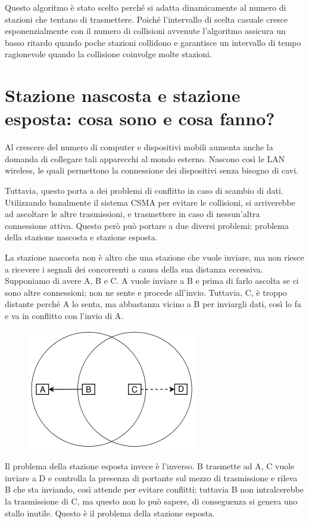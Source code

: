 Questo algoritmo è stato scelto perché si adatta dinamicamente al numero di stazioni che tentano di trasmettere. Poiché l’intervallo di scelta casuale cresce esponenzialmente con il numero di collisioni avvenute l’algoritmo assicura un basso ritardo quando poche stazioni collidono e garantisce un intervallo di tempo ragionevole quando la collisione coinvolge molte stazioni.

\section{Stazione nascosta e stazione esposta: cosa sono e cosa fanno?}

Al crescere del numero di computer e dispositivi mobili aumenta anche la domanda di collegare tali apparecchi al mondo esterno.
Nascono così le LAN wireless, le quali permettono la connessione dei dispositivi senza bisogno di cavi.

Tuttavia, questo porta a dei problemi di conflitto in caso di scambio di dati.
Utilizzando banalmente il sistema CSMA per evitare le collisioni, si arriverebbe ad ascoltare le altre trasmissioni, e trasmettere in caso di nessun’altra connessione attiva.
Questo però può portare a due diversi problemi: problema della stazione nascosta e stazione esposta.

La stazione nascosta non è altro che una stazione che vuole inviare, ma non riesce a ricevere i segnali dei concorrenti a causa della sua distanza eccessiva. Supponiamo di avere A, B e C. A vuole inviare a B e prima di farlo ascolta se ci sono altre connessioni; non ne sente e procede all’invio. Tuttavia, C, è troppo distante perché A lo senta, ma abbastanza vicino a B per inviargli dati, così lo fa e va in conflitto con l’invio di A.

\begin{figure}[H]
\centering
\includegraphics[scale=0.6]{res/img/30_StazioneEsposta.png}
\end{figure} 
 
Il problema della stazione esposta invece è l’inverso. B trasmette ad A, C vuole inviare a D e controlla la presenza di portante sul mezzo di trasmissione e rileva B che sta inviando, così attende per evitare conflitti; tuttavia B non intralcerebbe la trasmissione di C, ma questo non lo può sapere, di conseguenza si genera uno stallo inutile. Questo è il problema della stazione esposta.
 
